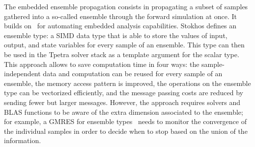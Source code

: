 The embedded ensemble propagation consists in propagating a subset of samples gathered into a so-called ensemble through the forward simulation at once.
It builds on~\cite{pawlowski2012automating} for automating embedded analysis capabilities. Stokhos defines an ensemble type: a SIMD data type that is able to store
the values of input, output, and state variables for every sample of an ensemble. This type can then be used in the Tpetra solver stack as a template argument for the scalar type.
This approach allows to save computation time in four ways: the sample-independent data and computation can be reused for every sample of an ensemble, the memory access pattern is improved,
the operations on the ensemble type can be vectorized efficiently, and the message passing costs are reduced by sending fewer but larger messages.
However, the approach requires solvers and BLAS functions to be aware of the extra dimension associated to the ensemble; for example, a GMRES for ensemble types~\cite{liegeois2020gmres} needs to monitor
the convergence of the individual samples in order to decide when to stop based on the union of the information.

